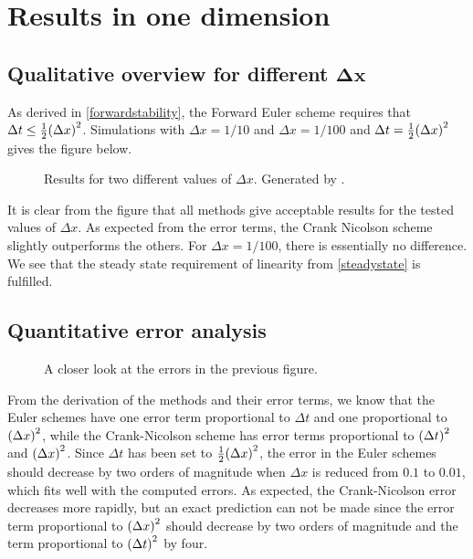 %
\section{Results in one dimension}
\subsection{Qualitative overview for different \(\boldsymbol{\Delta x}\)}
As derived in \ref{forwardstability}, the Forward Euler scheme requires that \(\Delta t \leq \tfrac{1}{2}\qty(\Delta x)^2\). Simulations with \(\Delta x = 1/10\) and \(\Delta x = 1/100\) and \(\Delta t = \tfrac{1}{2}\qty(\Delta x)^2\) gives the figure below.
\begin{figure}[H]
\centering

\caption{Results for two different values of \(\Delta x\). Generated by .}
\end{figure}
It is clear from the figure that all methods give acceptable results for the tested values of \(\Delta x\). As expected from the error terms, the Crank Nicolson scheme slightly outperforms the others. For \(\Delta x=1/100\), there is essentially no difference. We see that the steady state requirement of linearity from \ref{steadystate} is fulfilled.

\subsection{Quantitative error analysis}
\begin{figure}[H]
\centering

\caption{A closer look at the errors in the previous figure.}
\end{figure}
From the derivation of the methods and their error terms, we know that the Euler schemes have one error term proportional to \(\Delta t\) and one proportional to \(\qty(\Delta x)^2\), while the Crank-Nicolson scheme has error terms proportional to \(\qty(\Delta t)^2\) and \(\qty(\Delta x)^2\). Since \(\Delta t\) has been set to \(\tfrac{1}{2}\qty(\Delta x)^2\), the error in the Euler schemes should decrease by two orders of magnitude when \(\Delta x\) is reduced from \(\num{0.1}\) to \(\num{0.01}\), which fits well with the computed errors. As expected, the Crank-Nicolson error decreases more rapidly, but an exact prediction can not be made since the error term proportional to \(\qty(\Delta x)^2\) should decrease by two orders of magnitude and the term proportional to \(\qty(\Delta t)^2\) by four.


